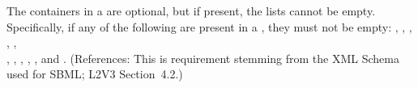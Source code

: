 The  containers in a \Model are optional, but
if present, the lists cannot be empty.  Specifically, if any of
the following are present in a \Model, they must not be empty:
, ,
, ,
, \\
,
, ,
, ,
 and .  (References:
This is requirement stemming from the XML Schema used for SBML;
L2V3 Section~4.2.)
